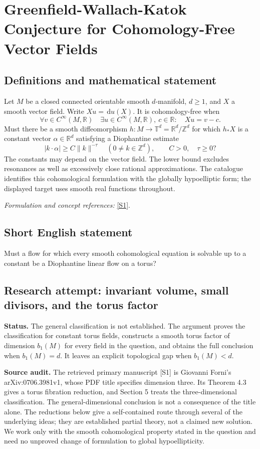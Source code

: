 \documentclass[11pt]{article}
\begin{document}
\section*{\texorpdfstring{Greenfield-Wallach-Katok Conjecture for Cohomology-Free Vector Fields}{Greenfield-Wallach-Katok Conjecture for Cohomology-Free Vector Fields}}\label{statement}
\subsection{Definitions and mathematical statement}
Let $M$ be a closed connected orientable smooth $d$-manifold, $d\ge1$, and $X$ a smooth vector field. Write $Xu={\,\mathrm{d}} u(X)$. It is cohomology-free when
\[
 \forall v\in C^\infty(M,{\mathbb{R}})\quad
 \exists u\in C^\infty(M,{\mathbb{R}}),\ c\in{\mathbb{R}}:\quad Xu=v-c.
\]
Must there be a smooth diffeomorphism $h:M\to\mathbb T^d={\mathbb{R}}^d/{\mathbb{Z}}^d$ for which $h_*X$ is a constant vector $\alpha\in{\mathbb{R}}^d$ satisfying a Diophantine estimate
\[
 |k\cdot\alpha|\ge C\|k\|^{-\tau}
 \quad(0\ne k\in{\mathbb{Z}}^d),\qquad C>0,\quad\tau\ge0?
\]
The constants may depend on the vector field. The lower bound excludes resonances as well as excessively close rational approximations. The catalogue identifies this cohomological formulation with the globally hypoelliptic form; the displayed target uses smooth real functions throughout.
\par\smallskip\textit{Formulation and concept references:} \href{https://arxiv.org/pdf/0706.3981}{[S1]}.

\subsection{Short English statement}
Must a flow for which every smooth cohomological equation is solvable up to a constant be a Diophantine linear flow on a torus?
\subsection{Research attempt: invariant volume, small divisors, and the torus factor}
\textbf{Status.} The general classification is not established. The argument proves the classification for constant torus fields, constructs a smooth torus factor of dimension $b_1(M)$ for every field in the question, and obtains the full conclusion when $b_1(M)=d$. It leaves an explicit topological gap when $b_1(M)<d$.

\textbf{Source audit.} The retrieved primary manuscript [S1] is Giovanni Forni's arXiv:0706.3981v1, whose PDF title specifies dimension three. Its Theorem 4.3 gives a torus fibration reduction, and Section 5 treats the three-dimensional classification. The general-dimensional conclusion is not a consequence of the title alone. The reductions below give a self-contained route through several of the underlying ideas; they are established partial theory, not a claimed new solution. We work only with the smooth cohomological property stated in the question and need no unproved change of formulation to global hypoellipticity.
\end{document}
